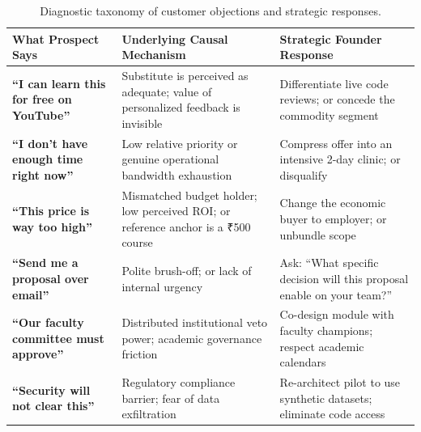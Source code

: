 \begin{table}[h]
\centering
\small
\begin{tabularx}{\columnwidth}{>{\RaggedRight\bfseries}p{2.3cm} >{\RaggedRight}X >{\RaggedRight}p{2.1cm}}
\toprule
What Prospect Says & Underlying Causal Mechanism & Strategic Founder Response \\
\midrule
``I can learn this for free on YouTube'' & Substitute is perceived as adequate; value of personalized feedback is invisible & Differentiate live code reviews; or concede the commodity segment \\
\addlinespace
``I don't have enough time right now'' & Low relative priority or genuine operational bandwidth exhaustion & Compress offer into an intensive 2-day clinic; or disqualify \\
\addlinespace
``This price is way too high'' & Mismatched budget holder; low perceived ROI; or reference anchor is a ₹500 course & Change the economic buyer to employer; or unbundle scope \\
\addlinespace
``Send me a proposal over email'' & Polite brush-off; or lack of internal urgency & Ask: ``What specific decision will this proposal enable on your team?'' \\
\addlinespace
``Our faculty committee must approve'' & Distributed institutional veto power; academic governance friction & Co-design module with faculty champions; respect academic calendars \\
\addlinespace
``Security will not clear this'' & Regulatory compliance barrier; fear of data exfiltration & Re-architect pilot to use synthetic datasets; eliminate code access \\
\bottomrule
\end{tabularx}
\caption{Diagnostic taxonomy of customer objections and strategic responses.}
\label{tab:ch6_objections_taxonomy}
\end{table}

